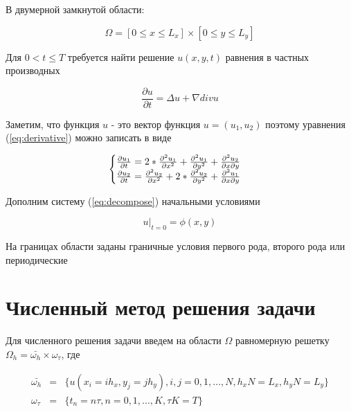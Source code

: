 \documentclass[12pt,a4paper]{scrartcl}
\begin{document}
В двумерной замкнутой области:

\begin{equation}
    \Omega = [0 \leq x \leq L_x] \times [0 \leq y \leq L_y]
\end{equation}

Для $0 < t \leq T$ требуется найти решение $u(x,y,t)$ равнения в частных производных

\begin{equation}
    \label{eq:derivative}
    \frac{\partial u}{\partial t} = \Delta u + \nabla div u
\end{equation}

Заметим, что функция $u$ - это вектор функция $u=(u_1, u_2)$ поэтому уравнения (\ref{eq:derivative})
можно записать в виде

\begin{equation}
    \begin{cases} 
    \label{eq:decompose}
        \frac{\partial{u_1}}{\partial t} = 2 * \pdv[2]{u_1}{x} + \pdv[2]{u_1}{y} + \pdv{u_2}{x}{y} \\ 
        \frac{\partial{u_2}}{\partial t} = \pdv[2]{u_2}{x} + 2 * \pdv[2]{u_2}{y} + \pdv{u_1}{x}{y} \\ 
    \end{cases}
\end{equation}

Дополним систему (\ref{eq:decompose}) начальными условиями

\begin{equation}
    \label{eq:initialcondition}
    u|_{t = 0} = \phi(x, y)
\end{equation}

На границах области заданы граничные условия первого рода, второго рода или периодические
\newpage

\section{Численный метод решения задачи}

Для численного решения задачи введем на области $\Omega$ равномерную решетку
$\Omega_h = \bar{\omega_h} \times \omega_{\tau}$, где

\begin{equation}
\begin{array}{lcl}
    \bar{\omega_{h}} & = & \{u(x_i = ih_x, y_j = jh_y),i,j = 0,1,...,N, h_xN = L_x, h_y N = L_y\} \\
    \omega_{\tau} & = & \{t_n = n\tau, n = 0,1,...,K, \tau K = T\} \\
\end{array}
\end{equation}
\end{document}
